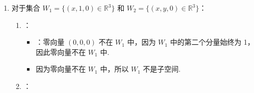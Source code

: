 \begin{exercise}
\begin{exgroup}
\begin{answer}
\begin{enumerate}
\begin{enumerate}
                    假设 \( \mathbf{v} = (x_1, \ldots, x_n) \) 和 \( \mathbf{w} = (y_1, \ldots, y_n) \) 属于 \( W \)，即：
                    \[
                    a_1x_1 + \cdots + a_nx_n = 0 \quad \text{且} \quad a_1y_1 + \cdots + a_ny_n = 0.
                    \]
                    那么，对于 \( \mathbf{v} + \mathbf{w} = (x_1 + y_1, \ldots, x_n + y_n) \)，有：
                    \[
                    a_1(x_1 + y_1) + \cdots + a_n(x_n + y_n) = (a_1x_1 + \cdots + a_nx_n) + (a_1y_1 + \cdots + a_ny_n) = 0 + 0 = 0.
                    \]
                    因此，\( \mathbf{v} + \mathbf{w} \in W \).

                    \item {}：

                    对于任意 \( \mathbf{v} = (x_1, \ldots, x_n) \in W \) 和任意 \( \lambda \in F \)，有：
                    \[
                    a_1(\lambda x_1) + \cdots + a_n(\lambda x_n) = \lambda (a_1x_1 + \cdots + a_nx_n) = \lambda \cdot 0 = 0.
                    \]
                    因此，\( \lambda \mathbf{v} \in W \).
                \end{enumerate}

                由于上述三个条件均满足，集合 \( W \) 是 \( F^n \) 的一个子空间.

                \item 对于集合 \( W_1 = \{(x, 1, 0) \in \mathbb{R}^3\} \) 和 \( W_2 = \{(x, y, 0) \in \mathbb{R}^3\} \)：

                \begin{enumerate}
                    \item {}：

                    \begin{itemize}
                        \item {}：零向量 \( (0, 0, 0) \) 不在 \( W_1 \) 中，因为 \( W_1 \) 中的第二个分量始终为 1，因此零向量不在 \( W_1 \) 中.
                        \item 因为零向量不在 \( W_1 \) 中，所以 \( W_1 \) 不是子空间.
                    \end{itemize}

                    \item {}：


\end{enumerate}
\end{enumerate}
\end{answer}
\end{exgroup}
\end{exercise}

